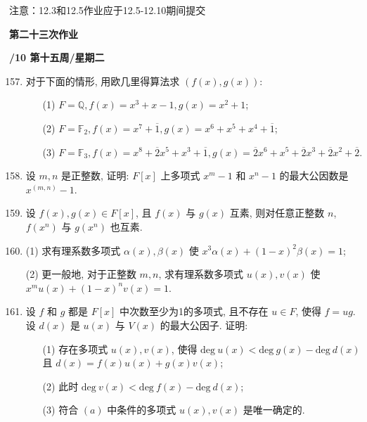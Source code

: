 \documentclass[a4paper,12pt]{article}
\begin{document}
{\color{red} 注意：12.3和12.5作业应于12.5-12.10期间提交}


\newpage
\head

\begin{center} %
	{\Large \bf 第二十三次作业} %
	\vspace{2mm}
	
	{\bf{}/10 \quad  第十五周/星期二} %
\end{center} 

\begin{enumerate}\setcounter{enumi}{156}

\item 对于下面的情形, 用欧几里得算法求 $(f(x),g(x))$: \begin{enumerate}
    \item[(1)] $F=\mathbb{Q},f(x)=x^3+x-1,g(x)=x^2+1$;
    \item[(2)] $F=\mathbb{F}_2,f(x)=x^7+\overline{1},g(x)=x^6+x^5+x^4+\overline{1}$;
    \item[(3)] $F=\mathbb{F}_3,f(x)=x^8+\overline{2}x^5+x^3+\overline{1},g(x)=\overline{2}x^6+x^5+\overline{2}x^3+\overline{2}x^2+\overline{2}$.
\end{enumerate}

\item 设 $m,n$ 是正整数, 证明: $F[x]$ 上多项式 $x^m-1$ 和 $x^n-1$ 的最大公因数是 $x^{(m,n)}-1$. 

\item 设 $f(x),g(x)\in F[x]$, 且 $f(x)$ 与 $g(x)$ 互素, 则对任意正整数 $n$, $f(x^n)$ 与 $g(x^n)$ 也互素.

\item (1) 求有理系数多项式 $\alpha(x),\beta(x)$ 使 $x^3\alpha(x)+(1-x)^2\beta(x)=1$;
    \par(2) 更一般地, 对于正整数 $m,n$, 求有理系数多项式 $u(x),v(x)$ 使 $x^mu(x)+(1-x)^nv(x)=1$.

\item 设 $f$ 和 $g$ 都是 $F[x]$ 中次数至少为1的多项式, 且不存在 $u\in F$, 使得 $f=ug$. 设 $d(x)$ 是 $u(x)$ 与 $V(x)$ 的最大公因子. 证明: 
    \begin{enumerate}
        \item[(1)] 存在多项式 $u(x),v(x)$, 使得 $\text{deg}\ u(x)<\text{deg}\ g(x)-\text{deg}\ d(x)$ 且 $d(x)=f(x)u(x)+g(x)v(x)$;
        \item[(2)] 此时 $\text{deg}\ v(x)<\text{deg}\ f(x)-\text{deg}\ d(x)$;
        \item[(3)] 符合 $(a)$ 中条件的多项式 $u(x),v(x)$ 是唯一确定的.
    \end{enumerate}


\end{enumerate}
\end{document}

